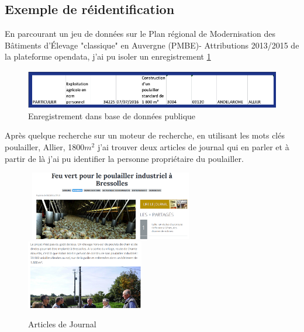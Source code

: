 \subsection{Exemple de réidentification}
En parcourant un jeu de données sur le Plan régional de Modernisation des Bâtiments d’Élevage "classique" en Auvergne (PMBE)- Attributions 2013/2015  de la plateforme opendata, j'ai pu isoler un enregistrement \ref{fig:Enregistrement dans base de données publique}
\begin{figure}
    \centering
    \includegraphics[width=\textwidth]{images/anonymisation/exemple1_anonymisation.png}
    \caption{Enregistrement dans base de données publique}
    \label{fig:Enregistrement dans base de données publique}
\end{figure}
Après quelque recherche sur un moteur de recherche, en utilisant les mots clés poulailler, Allier, 1800\begin{math}m^{2}\end{math} j'ai trouver deux articles de journal qui en parler et à partir de là j'ai pu identifier la personne propriétaire du poulailler.
\begin {figure}
\begin{center}
    \hbox{ 
    \includegraphics[height=3cm]{images/anonymisation/exemple2_anonymisation.png}
    \hspace*{1cm}  %
    \includegraphics[height=3cm]{images/anonymisation/exemple3_anonymisation.png}
  }
\caption{Articles de Journal}
\label{fig : Articles de Journal}
\end{center}
\end {figure}

